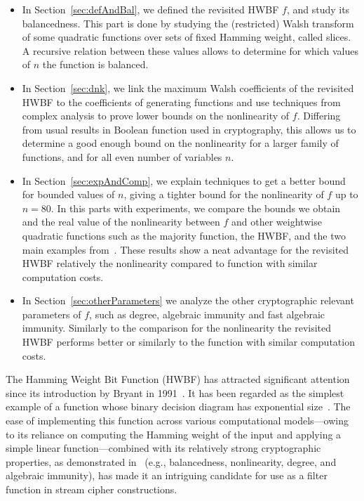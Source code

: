 \documentclass[11pt]{llncs}
\begin{document}
\begin{itemize}
	\item In Section~\ref{sec:defAndBal}, we defined the revisited HWBF $f$, and study its balancedness. This part is done by studying the (restricted) Walsh transform of some quadratic functions over sets of fixed Hamming weight, called slices. A recursive relation between these values allows to determine for which values of $n$ the function is balanced.
	\item In Section~\ref{sec:dnk}, we link the maximum Walsh coefficients of the revisited HWBF to the coefficients of generating functions and use techniques from complex analysis to prove lower bounds on the nonlinearity of $f$. 
	Differing from usual results in Boolean function used in cryptography, this allows us to determine a good enough bound on the nonlinearity for a larger family of functions, and for all even number of variables $n$.
	\item In Section~\ref{sec:expAndComp}, we explain techniques to get a better bound for bounded values of $n$, giving a tighter bound for the nonlinearity of $f$ up to $n=80$. In this parts with experiments, we compare the bounds we obtain and the real value of the nonlinearity between $f$ and other weightwise quadratic functions such as the majority function, the HWBF, and the two main examples from~\cite{DAM:MeaOza24}. These results show a neat advantage for the revisited HWBF relatively the nonlinearity compared to function with similar computation costs.
	\item In Section~\ref{sec:otherParameters} we analyze the other cryptographic relevant parameters of $f$, such as degree, algebraic immunity and fast algebraic immunity. Similarly to the comparison for the nonlinearity the revisited HWBF performs better or similarly to the function with similar computation costs.
		
\end{itemize}

\fi

The Hamming Weight Bit Function (HWBF) has attracted significant attention since its introduction by Bryant in 1991~\cite{IEEE:Bryant91}. It has been regarded as the simplest example of a function whose binary decision diagram has exponential size~\cite{IEEE:Bryant91,TIA:BoLSW99}. The ease of implementing this function across various computational models—owing to its reliance on computing the Hamming weight of the input and applying a simple linear function—combined with its relatively strong cryptographic properties, as demonstrated in~\cite{DAM:WCST14} (e.g., balancedness, nonlinearity, degree, and algebraic immunity), has made it an intriguing candidate for use as a filter function in stream cipher constructions.
\end{document}

